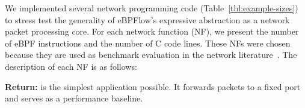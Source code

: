 We implemented several network programming code (Table~\ref{tbl:example-sizes}) to stress test the generality of eBPFlow's expressive abstraction as a network packet processing core.
For each network function (NF), we present the number of eBPF instructions and the number of C code lines. 
These NFs were chosen because they are used as benchmark evaluation in the network literature~\cite{Panda:2016,Sun:2017:NEN:3098822.3098826}.
The description of each NF is as follows:

\begin{table}[t]
\centering
\caption{eBPF programs used during experiments.}
\label{tbl:example-sizes}
\end{table}

\textbf{Return:} is the simplest application possible. It forwards packets to a fixed port and serves as a performance baseline. 


